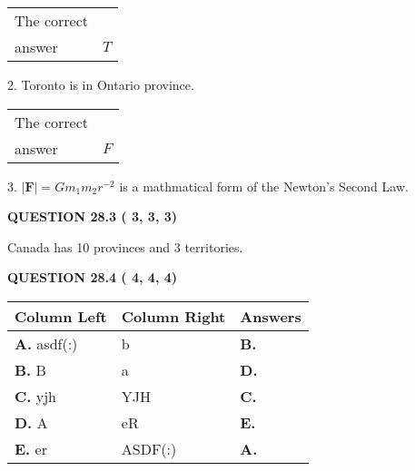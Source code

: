 \documentclass[12pt]{article}
\begin{document}
\noindent\begin{tabular}{|l|l|}\hline The correct & \\
          answer &  %
$T$ \\ \hline \end{tabular}
2.  %
Toronto is in  %
Ontario province.
 
\noindent\begin{tabular}{|l|l|}\hline The correct & \\
          answer &  %
$F$ \\ \hline \end{tabular}
3.  %
$\left| \mathbf{F}\right| =Gm_1m_2r^{-2}$ is a mathmatical form of  %
the Newton's Second Law.
 
 
 
  
\vspace{0.2in}
  
{\textbf{\Large{QUESTION
28.3 
 (          3,          3,          3)
}}}
  
  
 
 
\noindent{}
 
 
Canada has  %
10 provinces and  %
3 territories.
 
 
 
 
  
\vspace{0.2in}
  
{\textbf{\Large{QUESTION
28.4 
 (          4,          4,          4)
}}}
  
  
 
 
\noindent{}
  
  
\begin{tabular}{|l|l|l|}
 \hline
 Column Left & Column Right  & Answers       \\ 
 \hline
{\textbf{\large{
A.}}}
asdf(:)
  & 
b
 & 
{\textbf{\large{
B.}}}
 \\ 
 \hline
{\textbf{\large{
B.}}}
B
  & 
a
 & 
{\textbf{\large{
D.}}}
 \\ 
 \hline
{\textbf{\large{
C.}}}
yjh
  & 
YJH
 & 
{\textbf{\large{
C.}}}
 \\ 
 \hline
{\textbf{\large{
D.}}}
A
  & 
eR
 & 
{\textbf{\large{
E.}}}
 \\ 
 \hline
{\textbf{\large{
E.}}}
er
  & 
ASDF(:)
 & 
{\textbf{\large{
A.}}}
 \\ 
 \hline
 \end{tabular}
  
\end{document}
